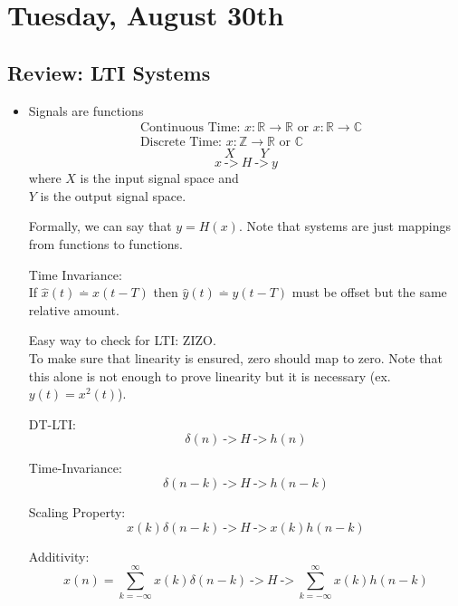 \section{Tuesday, August 30th}
\subsection{Review: LTI Systems}

\begin{itemize}
    \item Signals are functions
    \begin{align*}
    &\text{Continuous Time: } x : \mathbb{R} \rightarrow \mathbb{R} 
    \text{ or } x : \mathbb{R} \rightarrow\mathbb{C}
    \\
    &\text{Discrete Time: } x :  \mathbb{Z} \rightarrow \mathbb{R} \text{ or } \mathbb{C}
    \end{align*}
    \[
        X \quad\quad Y
    \]
    \[
        x \ \texttt{->} \ \boxed{H} \ \texttt{->} \  y
    \]
    where $X$ is the input signal space and\\
    $Y$ is the output signal space.
    
    Formally, we can say that $y=H(x)$. Note that systems are just mappings from functions to functions.
    
    \begin{shaded}
    Time Invariance:\\
    If $\hat x(t)\stackrel{.} = x(t-T)$ then $\hat y(t) \stackrel.= y(t-T)$ must be offset but the same relative amount.
    \end{shaded}
    
    Easy way to check for LTI: ZIZO.\\
    To make sure that linearity is ensured, zero should map to zero. Note that this alone is not enough to prove linearity but it is necessary (ex. $y(t)=x^2(t)$).

    DT-LTI:    
    \[
        \delta(n) \ \texttt{->} \ \boxed{H} \ \texttt{->} \  h(n)
    \]
    
    Time-Invariance:
    \[
        \delta(n-k) \ \texttt{->} \ \boxed{H} \ \texttt{->} \  h(n-k)
    \]
    
    Scaling Property:
    \[
        x(k)\delta(n-k) \ \texttt{->} \ \boxed{H} \ \texttt{->} \  x(k)h(n-k)
    \]
    
    Additivity:
    \[
        x(n)=\sum_{k=-\infty}^\infty x(k)\delta(n-k) \ \texttt{->} \ \boxed{H} \ \texttt{->} \  \sum_{k=-\infty}^\infty x(k)h(n-k)
    \]
    

\end{itemize}
